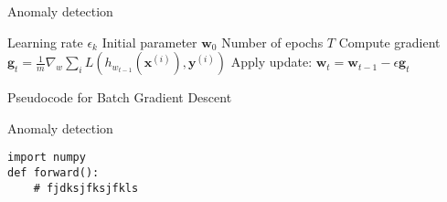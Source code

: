 \documentclass{beamer}
\begin{document}
\begin{frame}{Anomaly detection}  
\begin{algorithm}[H]
	\begin{algorithmic}
		\REQUIRE Learning rate $\epsilon_k$
		\REQUIRE Initial parameter $\bm{w}_0$
		\REQUIRE Number of epochs $T$
		\STATE Compute gradient $\bm{g}_t=\frac{1}{m}\nabla_w\sum_i L(h_{w_{t-1}}(\bm{x}^{(i)}), \bm{y}^{(i)})$ 
		\STATE Apply update: $\bm{w}_t=\bm{w}_{t-1}-\epsilon \bm{g}_t$
		\ENDFOR
	\end{algorithmic}
	\caption{Pseudocode for Batch Gradient Descent}
	\label{alg:seq}
\end{algorithm}
\end{frame}

\begin{frame}[fragile]{Anomaly detection}
\begin{verbatim}
import numpy
def forward():
    # fjdksjfksjfkls
\end{verbatim}
\end{frame}
\end{document}
